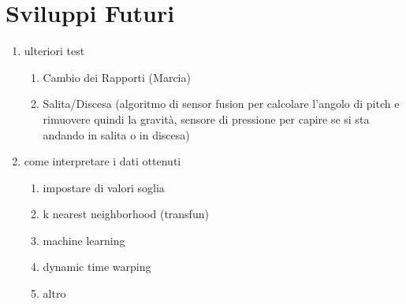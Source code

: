 \documentclass[class=article]{standalone}
\begin{document}
	
	\section{Sviluppi Futuri}
	\begin{enumerate}
		\item ulteriori test
		\begin{enumerate}
			\item Cambio dei Rapporti (Marcia)
			\item Salita/Discesa (algoritmo di sensor fusion per calcolare l'angolo di pitch e rimuovere quindi la gravità, sensore di pressione per capire se si sta andando in salita o in discesa)
		\end{enumerate}
		\item come interpretare i dati ottenuti
		\begin{enumerate}
			\item impostare di valori soglia
			\item k nearest neighborhood (transfun)
			\item machine learning
			\item dynamic time warping
			\item altro
		\end{enumerate}
		
	\end{enumerate}
	
\end{document}
